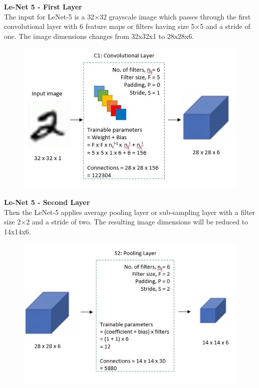 \documentclass[10pt, compress]{beamer}
\begin{document}
\begin{frame}
  \vspace{0.6cm}
  \textbf{Le-Net 5 - First Layer} \\
  The input for LeNet-5 is a 32×32 grayscale image which passes through the first convolutional layer with 6 feature maps or filters having size 5×5 and a stride of one. The image dimensions changes from 32x32x1 to 28x28x6.
  \begin{figure}
    \includegraphics[width=.75\linewidth]{imgs/cnn/LeNet_Layer1}
  \end{figure}
\end{frame}

\begin{frame}
  \vspace{0.6cm}
  \textbf{Le-Net 5 - Second Layer} \\
  Then the LeNet-5 applies average pooling layer or sub-sampling layer with a filter size 2×2 and a stride of two. The resulting image dimensions will be reduced to 14x14x6.
  \begin{figure}
    \includegraphics[width=.75\linewidth]{imgs/cnn/LeNet_Layer2}
  \end{figure}
\end{frame}
\end{document}
